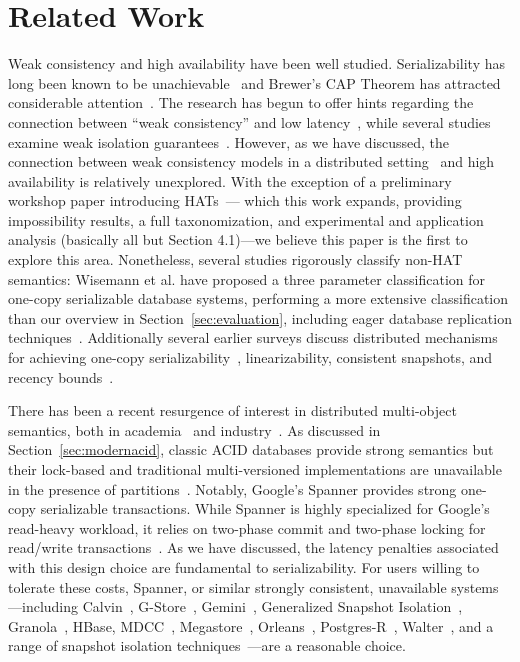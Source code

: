
\section{Related Work}

Weak consistency and high availability have been well
studied. Serializability has long been known to be
unachievable~\cite{davidson-survey} and Brewer's CAP Theorem has
attracted considerable attention~\cite{gilbert-cap}. The research has
begun to offer hints regarding the connection between ``weak
consistency'' and low latency~\cite{abadi-pacelc}, while several
studies examine weak isolation guarantees~\cite{adya,
  ansicritique}. However, as we have discussed, the connection between
weak consistency models in a distributed setting~\cite{calm, crdt} and
high availability is relatively unexplored. With the exception of a
preliminary workshop paper introducing HATs~\cite{hat-hotos}--- which
this work expands, providing impossibility results, a full
taxonomization, and experimental and application analysis (basically
all but Section 4.1)---we believe this paper is the first to explore
this area. Nonetheless, several studies rigorously classify non-HAT
semantics: Wisemann et al. have proposed a three parameter
classification for one-copy serializable database systems, performing
a more extensive classification than our overview in
Section~\ref{sec:evaluation}, including eager database replication
techniques~\cite{kemme-classification}. Additionally several earlier
surveys discuss distributed mechanisms for achieving one-copy
serializability~\cite{wisemann-survey}, linearizability, consistent
snapshots, and recency bounds~\cite{ceri-mechanism, chen-mechanism}.

There has been a recent resurgence of interest in distributed
multi-object semantics, both in academia~\cite{kraska-s3, granola,
  gstore, mdcc, redblue, cops, eiger, walter,calvin, swift} and
industry~\cite{megastore, orleans, spanner}. As discussed in
Section~\ref{sec:modernacid}, classic ACID databases provide strong
semantics but their lock-based and traditional multi-versioned
implementations are unavailable in the presence of
partitions~\cite{bernstein-concurrency, bernstein-book,
  gray-isolation}. Notably, Google's Spanner provides strong one-copy
serializable transactions. While Spanner is highly specialized for
Google's read-heavy workload, it relies on two-phase commit and
two-phase locking for read/write transactions~\cite{spanner}. As we
have discussed, the latency penalties associated with this design
choice are fundamental to serializability. For users willing to
tolerate these costs, Spanner, or similar strongly consistent,
unavailable systems---including Calvin~\cite{calvin},
G-Store~\cite{gstore}, Gemini~\cite{redblue}, Generalized Snapshot
Isolation~\cite{generalizedsnapshot}, Granola~\cite{granola},
HBase, MDCC~\cite{mdcc}, Megastore~\cite{megastore},
Orleans~\cite{orleans}, Postgres-R~\cite{kemme-thesis},
Walter~\cite{walter}, and a range of snapshot isolation
techniques~\cite{middleware-db, kemme-snapshot,
  daudjee-snapshot}---are a reasonable choice.

